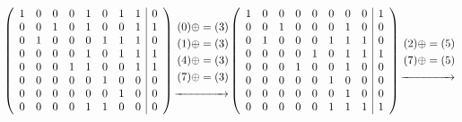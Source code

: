 \documentclass[a4paper,10pt]{article} %
\begin{document}
\begin{multline*}
		\left(
		\begin{array}{cccccccc|c}
		1 & 0 & 0 & 0 & 1 & 0 & 1 & 1 & 0 \\
		0 & 0 & 1 & 0 & 1 & 0 & 0 & 1 & 1 \\
		0 & 1 & 0 & 0 & 0 & 1 & 1 & 1 & 0 \\
		0 & 0 & 0 & 0 & 1 & 0 & 1 & 1 & 1 \\
		0 & 0 & 0 & 1 & 1 & 0 & 0 & 1 & 1 \\
		0 & 0 & 0 & 0 & 0 & 1 & 0 & 0 & 0 \\
		0 & 0 & 0 & 0 & 0 & 0 & 1 & 0 & 0 \\
		0 & 0 & 0 & 0 & 1 & 1 & 0 & 0 & 0 \\
		\end{array}
		\right)
		\begin{align}
		(0) \oplus= (3)\\
		(1) \oplus= (3)\\
		(4) \oplus= (3)\\
		(7) \oplus= (3)\\
		\xrightarrow{\hspace*{1.5cm}}
		\end{align}
		\left(
		\begin{array}{cccccccc|c}
		1 & 0 & 0 & 0 & 0 & 0 & 0 & 0 & 1 \\
		0 & 0 & 1 & 0 & 0 & 0 & 1 & 0 & 0 \\
		0 & 1 & 0 & 0 & 0 & 1 & 1 & 1 & 0 \\
		0 & 0 & 0 & 0 & 1 & 0 & 1 & 1 & 1 \\
		0 & 0 & 0 & 1 & 0 & 0 & 1 & 0 & 0 \\
		0 & 0 & 0 & 0 & 0 & 1 & 0 & 0 & 0 \\
		0 & 0 & 0 & 0 & 0 & 0 & 1 & 0 & 0 \\
		0 & 0 & 0 & 0 & 0 & 1 & 1 & 1 & 1 \\
		\end{array}
		\right)
		\begin{align}
		(2) \oplus= (5)\\
		(7) \oplus= (5)\\
		\xrightarrow{\hspace*{1.5cm}}
		\end{align}\\
\end{multline*}
\end{document}

